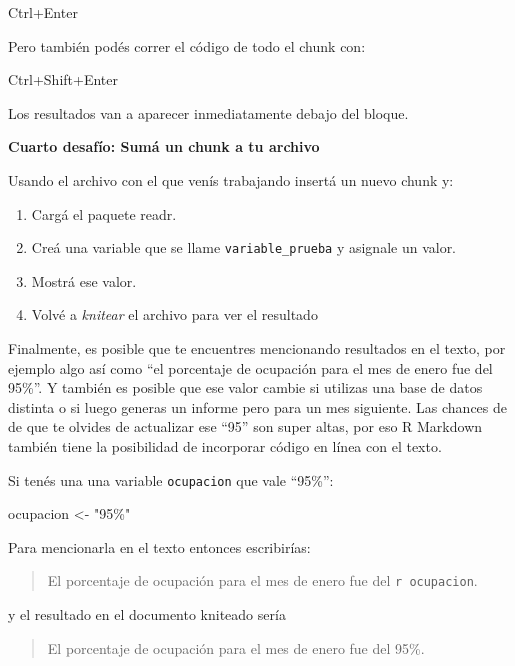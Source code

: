 \documentclass[
  openany]{book}
\newenvironment{Shaded}{\begin{snugshade}}{\end{snugshade}}
\newcommand{\NormalTok}[1]{#1}
\newcommand{\OtherTok}[1]{\textcolor[rgb]{0.56,0.35,0.01}{#1}}
\newcommand{\StringTok}[1]{\textcolor[rgb]{0.31,0.60,0.02}{#1}}
\providecommand{\tightlist}{%
  \setlength{\itemsep}{0pt}\setlength{\parskip}{0pt}}
\begin{document}
Ctrl+Enter

Pero también podés correr el código de todo el chunk con:

Ctrl+Shift+Enter

Los resultados van a aparecer inmediatamente debajo del bloque.

\textbf{Cuarto desafío: Sumá un chunk a tu archivo}

Usando el archivo con el que venís trabajando insertá un nuevo chunk y:

\begin{enumerate}
\def\labelenumi{\arabic{enumi}.}
\tightlist
\item
  Cargá el paquete readr.
\item
  Creá una variable que se llame \texttt{variable\_prueba} y asignale un valor.
\item
  Mostrá ese valor.
\item
  Volvé a \emph{knitear} el archivo para ver el resultado
\end{enumerate}

Finalmente, es posible que te encuentres mencionando resultados en el texto, por ejemplo algo así como ``el porcentaje de ocupación para el mes de enero fue del 95\%''.
Y también es posible que ese valor cambie si utilizas una base de datos distinta o si luego generas un informe pero para un mes siguiente.
Las chances de de que te olvides de actualizar ese ``95'' son super altas, por eso R Markdown también tiene la posibilidad de incorporar código en línea con el texto.

Si tenés una una variable \texttt{ocupacion} que vale ``95\%'':

\begin{Shaded}
\begin{Highlighting}[]
\NormalTok{ocupacion }\OtherTok{\textless{}{-}} \StringTok{"95\%"}
\end{Highlighting}
\end{Shaded}

Para mencionarla en el texto entonces escribirías:

\begin{quote}
El porcentaje de ocupación para el mes de enero fue del \texttt{\textasciigrave{}r\ ocupacion\textasciigrave{}}.
\end{quote}

y el resultado en el documento kniteado sería

\begin{quote}
El porcentaje de ocupación para el mes de enero fue del 95\%.
\end{quote}
\end{document}
